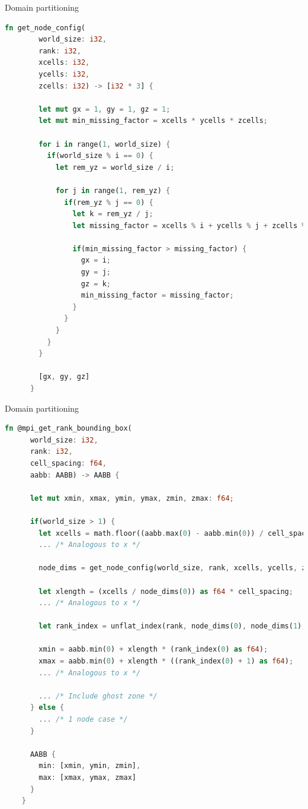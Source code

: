 \documentclass[aspectratio=43,t]{beamer}
\begin{document}
  \begin{frame}[fragile]{Domain partitioning}
    \begin{lstlisting}[basicstyle=\tiny\ttfamily,language=Rust]
      fn get_node_config(
        world_size: i32,
        rank: i32,
        xcells: i32, 
        ycells: i32, 
        zcells: i32) -> [i32 * 3] { 

        let mut gx = 1, gy = 1, gz = 1; 
        let mut min_missing_factor = xcells * ycells * zcells;

        for i in range(1, world_size) {
          if(world_size % i == 0) { 
            let rem_yz = world_size / i; 

            for j in range(1, rem_yz) {
              if(rem_yz % j == 0) { 
                let k = rem_yz / j; 
                let missing_factor = xcells % i + ycells % j + zcells % k; 

                if(min_missing_factor > missing_factor) {
                  gx = i; 
                  gy = j; 
                  gz = k; 
                  min_missing_factor = missing_factor;
                }
              }
            }    
          }    
        }

        [gx, gy, gz]
      }
    \end{lstlisting}
  \end{frame}

  \begin{frame}[fragile]{Domain partitioning}
    \begin{lstlisting}[basicstyle=\tiny\ttfamily,language=Rust]
    fn @mpi_get_rank_bounding_box(
      world_size: i32,
      rank: i32,
      cell_spacing: f64,
      aabb: AABB) -> AABB {

      let mut xmin, xmax, ymin, ymax, zmin, zmax: f64;

      if(world_size > 1) {
        let xcells = math.floor((aabb.max(0) - aabb.min(0)) / cell_spacing) as i32;
        ... /* Analogous to x */

        node_dims = get_node_config(world_size, rank, xcells, ycells, zcells);

        let xlength = (xcells / node_dims(0)) as f64 * cell_spacing;
        ... /* Analogous to x */

        let rank_index = unflat_index(rank, node_dims(0), node_dims(1), node_dims(2));

        xmin = aabb.min(0) + xlength * (rank_index(0) as f64);
        xmax = aabb.min(0) + xlength * ((rank_index(0) + 1) as f64);
        ... /* Analogous to x */

        ... /* Include ghost zone */
      } else {
        ... /* 1 node case */
      }

      AABB {
        min: [xmin, ymin, zmin],
        max: [xmax, ymax, zmax]
      }
    }
    \end{lstlisting}
  \end{frame}
\end{document}
